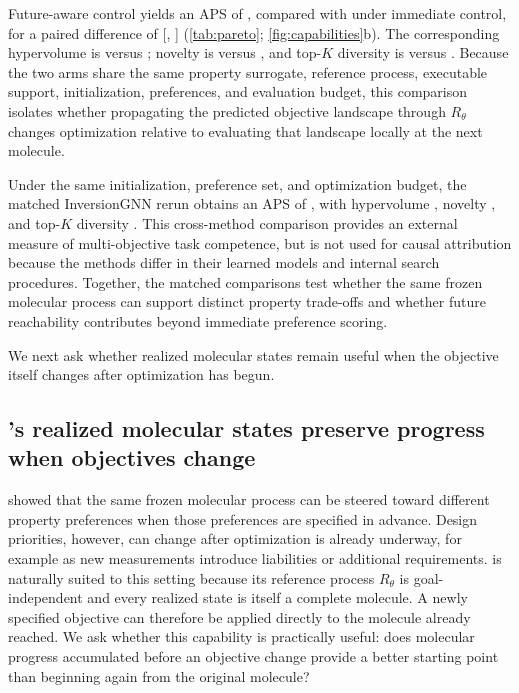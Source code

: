 Future-aware control yields an APS of \XXX{}, compared with \XXX{} under immediate control, for a paired difference of \XXX{} [\XXX{}, \XXX{}] (\cref{tab:pareto}; \cref{fig:capabilities}b). The corresponding hypervolume is \XXX{} versus \XXX{}; novelty is \XXX{} versus \XXX{}, and top-$K$ diversity is \XXX{} versus \XXX{}. Because the two \method{} arms share the same property surrogate, reference process, executable support, initialization, preferences, and evaluation budget, this comparison isolates whether propagating the predicted objective landscape through $R_\theta$ changes optimization relative to evaluating that landscape locally at the next molecule.

Under the same initialization, preference set, and optimization budget, the matched InversionGNN rerun obtains an APS of \XXX{}, with hypervolume \XXX{}, novelty \XXX{}, and top-$K$ diversity \XXX{}. This cross-method comparison provides an external measure of multi-objective task competence, but is not used for causal attribution because the methods differ in their learned models and internal search procedures. Together, the matched comparisons test whether the same frozen molecular process can support distinct property trade-offs and whether future reachability contributes beyond immediate preference scoring.

We next ask whether realized molecular states remain useful when the objective itself changes after optimization has begun.

\subsection{\method{}'s realized molecular states preserve progress when objectives change}
\label{sec:exp-retarget}

 showed that the same frozen molecular process can be steered toward different property preferences when those preferences are specified in advance. Design priorities, however, can change after optimization is already underway, for example as new measurements introduce liabilities or additional requirements. \method{} is naturally suited to this setting because its reference process $R_\theta$ is goal-independent and every realized state is itself a complete molecule. A newly specified objective can therefore be applied directly to the molecule already reached. We ask whether this capability is practically useful: does molecular progress accumulated before an objective change provide a better starting point than beginning again from the original molecule?

